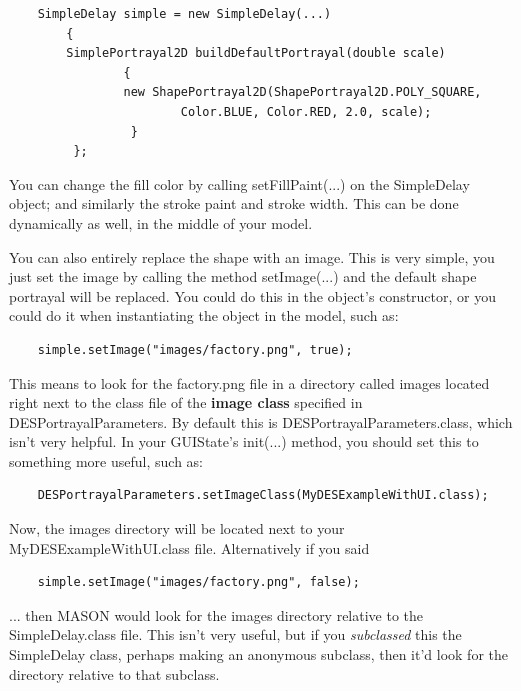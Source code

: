 \documentclass[twoside,10pt]{article}
\newcommand\file[1]{\textsf{#1}}
\newcommand\method[1]{\hbox{\textsf{#1}}}
\begin{document}
\begin{verbatim}
    SimpleDelay simple = new SimpleDelay(...)
        {
        SimplePortrayal2D buildDefaultPortrayal(double scale)
                {
                new ShapePortrayal2D(ShapePortrayal2D.POLY_SQUARE,
                        Color.BLUE, Color.RED, 2.0, scale);
                 }
         };
\end{verbatim}

You can change the fill color by calling \method{setFillPaint(...)} on the SimpleDelay object; and similarly the stroke paint and stroke width.  This can be done dynamically as well, in the middle of your model.

You can also entirely replace the shape with an image.  This is very simple, you just set the image by calling the method \method{setImage(...)} and the default shape portrayal will be replaced.  You could do this in the object's constructor, or you could do it when instantiating the object in the model, such as:

\begin{verbatim}
    simple.setImage("images/factory.png", true);
\end{verbatim}

This means to look for the \file{factory.png} file in a directory called \file{images} located right next to the class file of the {\bf image class} specified in DESPortrayalParameters.  By default this is DESPortrayalParameters.class, which isn't very helpful.  In your GUIState's \method{init(...)} method, you should set this to something more useful, such as:

\begin{verbatim}
    DESPortrayalParameters.setImageClass(MyDESExampleWithUI.class);
\end{verbatim}

Now, the \file{images} directory will be located next to your MyDESExampleWithUI.class file.  Alternatively if you said 

\begin{verbatim}
    simple.setImage("images/factory.png", false);
\end{verbatim}

... then MASON would look for the \file{images} directory relative to the SimpleDelay.class file.  This isn't very useful, but if you {\it subclassed} this the SimpleDelay class, perhaps making an anonymous subclass, then it'd look for the directory relative to that subclass.
\end{document}
